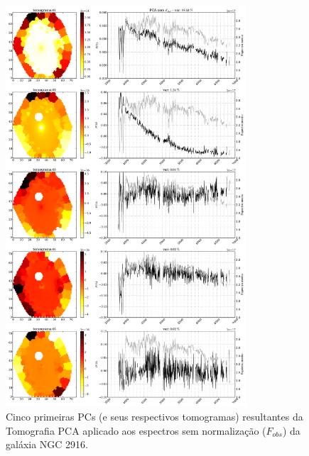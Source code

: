 \begin{figure}
    \includegraphics[width=0.8\textwidth]{figuras/K0277-tomo-obs.pdf}
    \caption[Tomogramas de 1 a 5 da gal\'axia NGC 2916 - $F_{obs}$.]
    {Cinco primeiras PCs (e seus respectivos tomogramas) resultantes da Tomografia PCA aplicado aos espectros sem
    normalização ($F_{obs}$) da galáxia NGC 2916.}
    \label{fig:K0277tomofobs}
\end{figure}

